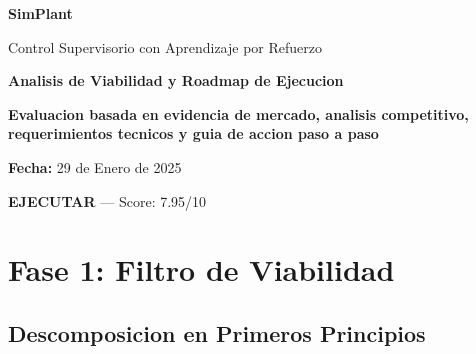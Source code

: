 \documentclass[11pt,a4paper]{article}
\begin{document}
\begin{titlepage}
    \centering
    \vspace*{2cm}
    
    {\Huge\bfseries\color{azuloscuro} SimPlant\par}
    \vspace{0.5cm}
    {\Large Control Supervisorio con Aprendizaje por Refuerzo\par}
    
    \vspace{2cm}
    
    {\LARGE\bfseries Analisis de Viabilidad y Roadmap de Ejecucion\par}
    
    \vspace{1.5cm}
    
    \begin{tcolorbox}[colback=grisclaro,colframe=azuloscuro,width=0.8\textwidth]
        \centering
        \textbf{Evaluacion basada en evidencia de mercado, analisis competitivo,\\
        requerimientos tecnicos y guia de accion paso a paso}
    \end{tcolorbox}
    
    \vfill
    
    {\large\textbf{Fecha:} 29 de Enero de 2025\par}
    
    \vspace{1cm}
    
    \begin{veredictobox}
        \centering
        \Large\textbf{EJECUTAR} --- Score: 7.95/10
    \end{veredictobox}
    
\end{titlepage}

\tableofcontents
\newpage

\section{Fase 1: Filtro de Viabilidad}

\subsection{Descomposicion en Primeros Principios}
\end{document}

